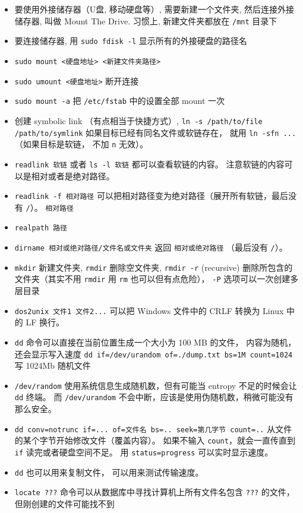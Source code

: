 \begin{itemize}
\item 要使用外接储存器（U盘, 移动硬盘等）, 需要新建一个文件夹, 然后连接外接储存器, 叫做 Mount The Drive. 习惯上, 新建文件夹都放在 \verb`/mnt` 目录下
\item 要连接储存器, 用 \verb`sudo fdisk -l` 显示所有的外接硬盘的路径名
\item \verb`sudo mount <硬盘地址> <新建文件夹路径>`
\item \verb`sudo umount <硬盘地址>` 断开连接
\item \verb`sudo mount -a` 把 \verb|/etc/fstab| 中的设置全部 mount 一次
\item 创建 symbolic link （有点相当于快捷方式）, \verb`ln -s /path/to/file /path/to/symlink` 如果目标已经有同名文件或软链存在， 就用 \verb|ln -sfn ...| （如果目标是软链， 不加 \verb|n| 无效）。
\item \verb|readlink 软链| 或者 \verb|ls -l 软链| 都可以查看软链的内容。 注意软链的内容可以是相对或者是绝对路径。
\item \verb|readlink -f 相对路径| 可以把相对路径变为绝对路径（展开所有软链，最后没有 \verb|/|）。 \verb|相对路径|
\item \verb|realpath 路径|
\item \verb|dirname 相对或绝对路径/文件名或文件夹| 返回 \verb|相对或绝对路径| （最后没有 \verb|/|）。
\item \verb`mkdir` 新建文件夹, \verb`rmdir` 删除空文件夹, \verb`rmdir -r` (recursive) 删除所包含的文件夹（其实不用 \verb`rmdir` 用 \verb`rm` 也可以但有点危险）， \verb`-P` 选项可以一次创建多层目录
\item \verb|dos2unix 文件1 文件2...| 可以把 Windows 文件中的 CRLF 转换为 Linux 中的 LF 换行。 
\item \verb`dd` 命令可以直接在当前位置生成一个大小为 100 MB 的文件， 内容为随机， 还会显示写入速度
\verb`dd if=/dev/urandom of=./dump.txt bs=1M count=1024` 写 1024Mb 随机文件
\item \verb|/dev/random| 使用系统信息生成随机数，但有可能当 entropy 不足的时候会让 \verb|dd| 终端。 而 \verb|/dev/urandom| 不会中断，应该是使用伪随机数，稍微可能没有那么安全。
\item \verb|dd conv=notrunc if=... of=文件名 bs=.. seek=第几字节 count=..|  从文件的某个字节开始修改文件（覆盖内容）。 如果不输入 \verb|count|，就会一直传直到 \verb|if| 读完或者硬盘空间不足。 用 \verb|status=progress| 可以实时显示速度。
\item \verb|dd| 也可以用来复制文件， 可以用来测试传输速度。
\item \verb`locate ???` 命令可以从数据库中寻找计算机上所有文件名包含 \verb`???` 的文件， 但刚创建的文件可能找不到

\end{itemize}
